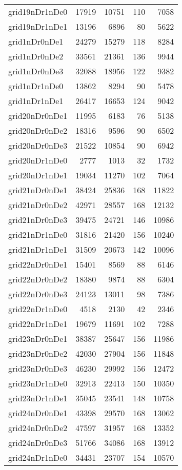 \begin{longtable}{lrrrr}
grid19nDr1nDe0 & 17919 & 10751 & 110 & 7058 \\
grid19nDr1nDe1 & 13196 & 6896 & 80 & 5622 \\
grid1nDr0nDe1 & 24279 & 15279 & 118 & 8284 \\
grid1nDr0nDe2 & 33561 & 21361 & 136 & 9944 \\
grid1nDr0nDe3 & 32088 & 18956 & 122 & 9382 \\
grid1nDr1nDe0 & 13862 & 8294 & 90 & 5478 \\
grid1nDr1nDe1 & 26417 & 16653 & 124 & 9042 \\
grid20nDr0nDe1 & 11995 & 6183 & 76 & 5138 \\
grid20nDr0nDe2 & 18316 & 9596 & 90 & 6502 \\
grid20nDr0nDe3 & 21522 & 10854 & 90 & 6942 \\
grid20nDr1nDe0 & 2777 & 1013 & 32 & 1732 \\
grid20nDr1nDe1 & 19034 & 11270 & 102 & 7064 \\
grid21nDr0nDe1 & 38424 & 25836 & 168 & 11822 \\
grid21nDr0nDe2 & 42971 & 28557 & 168 & 12132 \\
grid21nDr0nDe3 & 39475 & 24721 & 146 & 10986 \\
grid21nDr1nDe0 & 31816 & 21420 & 156 & 10240 \\
grid21nDr1nDe1 & 31509 & 20673 & 142 & 10096 \\
grid22nDr0nDe1 & 15401 & 8569 & 88 & 6146 \\
grid22nDr0nDe2 & 18380 & 9874 & 88 & 6304 \\
grid22nDr0nDe3 & 24123 & 13011 & 98 & 7386 \\
grid22nDr1nDe0 & 4518 & 2130 & 42 & 2346 \\
grid22nDr1nDe1 & 19679 & 11691 & 102 & 7288 \\
grid23nDr0nDe1 & 38387 & 25647 & 156 & 11986 \\
grid23nDr0nDe2 & 42030 & 27904 & 156 & 11848 \\
grid23nDr0nDe3 & 46230 & 29992 & 156 & 12472 \\
grid23nDr1nDe0 & 32913 & 22413 & 150 & 10350 \\
grid23nDr1nDe1 & 35045 & 23541 & 148 & 10758 \\
grid24nDr0nDe1 & 43398 & 29570 & 168 & 13062 \\
grid24nDr0nDe2 & 47597 & 31957 & 168 & 13352 \\
grid24nDr0nDe3 & 51766 & 34086 & 168 & 13912 \\
grid24nDr1nDe0 & 34431 & 23707 & 154 & 10570 \\

\end{longtable}
